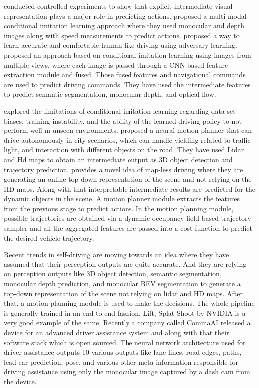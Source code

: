 \cite{DBLP:journals/corr/abs-1905-12887} conducted controlled experiments to show that explicit intermediate visual representation plays a major role in predicting actions. \cite{DBLP:journals/corr/abs-1906-03199} proposed a multi-modal conditional imitation learning approach where they used monocular and depth images along with speed measurements to predict actions. \cite{DBLP:journals/corr/abs-1903-10995} proposed a way to learn accurate and comfortable human-like driving using adversary learning. \cite{DBLP:journals/corr/abs-1912-00177} proposed an approach based on conditional imitation learning using images from multiple views, where each image is passed through a CNN-based feature extraction module and fused. Those fused features and navigational commands are used to predict driving commands. They have used the intermediate features to predict semantic segmentation, monocular depth, and optical flow. 


\cite{DBLP:journals/corr/abs-1904-08980} explored the limitations of conditional imitation learning regarding data set biases, training instability, and the ability of the learned driving policy to not perform well in unseen environments. \cite{DBLP:journals/corr/abs-2101-06679} proposed a neural motion planner that can drive autonomously in city scenarios, which can handle yielding related to traffic-light, and interaction with different objects on the road. They have used Lidar and Hd maps to obtain an intermediate output as 3D object detection and trajectory prediction. \cite{Casas_2021_CVPR} provides a novel idea of map-less driving where they are generating an online top-down representation of the scene and not relying on the HD maps. Along with that interpretable intermediate results are predicted for the dynamic objects in the scene. A motion planner module extracts the features from the previous stage to predict actions. In the motion planning module, possible trajectories are obtained via a dynamic occupancy field-based trajectory sampler and all the aggregated features are passed into a cost function to predict the desired vehicle trajectory.  

Recent trends in self-driving are moving towards an idea where they have assumed that their perception outputs are quite accurate. And they are relying on perception outputs like 3D object detection, semantic segmentation, monocular depth prediction, and monocular BEV segmentation to generate a top-down representation of the scene not relying on lidar and HD maps. After that, a motion planning module is used to make the decisions. The whole pipeline is generally trained in an end-to-end fashion. Lift, Splat Shoot \cite{DBLP:journals/corr/abs-2008-05711} by NVIDIA is a very good example of the same. Recently a company called CommaAI released a device for an advanced driver assistance system and along with that their software stack which is open sourced. The neural network architecture used for driver assistance outputs 10 various outputs like lane-lines, road edges, paths, lead car prediction, pose, and various other meta information responsible for driving assistance using only the monocular image captured by a dash cam from the device. 


